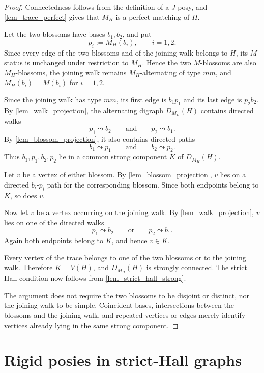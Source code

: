 \documentclass[preprint,12pt]{elsarticle}
\theoremstyle{plain}
\begin{document}
\begin{proof}
Connectedness follows from the definition of a \(J\)-posy, and
\cref{lem_trace_perfect} gives that \(M_H\) is a perfect matching of
\(H\).

Let the two blossoms have bases \(b_1,b_2\), and put
\[
p_i:=M_H(b_i),\qquad i=1,2.
\]
Since every edge of the two blossoms and of the joining walk belongs to
\(H\), its \(M\)-status is unchanged under restriction to \(M_H\). Hence
the two \(M\)-blossoms are also \(M_H\)-blossoms, the joining walk remains
\(M_H\)-alternating of type \(mm\), and \(M_H(b_i)=M(b_i)\) for
\(i=1,2\).

Since the joining walk has type \(mm\), its first edge is \(b_1p_1\) and
its last edge is \(p_2b_2\). By \cref{lem_walk_projection}, the alternating
digraph \(D_{M_H}(H)\) contains directed walks
\[
p_1\leadsto b_2
\qquad\text{and}\qquad
p_2\leadsto b_1.
\]
By \cref{lem_blossom_projection}, it also contains directed paths
\[
b_1\leadsto p_1
\qquad\text{and}\qquad
b_2\leadsto p_2.
\]
Thus \(b_1,p_1,b_2,p_2\) lie in a common strong component \(K\) of
\(D_{M_H}(H)\).

Let \(v\) be a vertex of either blossom. By
\cref{lem_blossom_projection}, \(v\) lies on a directed
\(b_i\)-\(p_i\) path for the corresponding blossom. Since both endpoints
belong to \(K\), so does \(v\).

Now let \(v\) be a vertex occurring on the joining walk. By
\cref{lem_walk_projection}, \(v\) lies on one of the directed walks
\[
p_1\leadsto b_2
\qquad\text{or}\qquad
p_2\leadsto b_1.
\]
Again both endpoints belong to \(K\), and hence \(v\in K\).

Every vertex of the trace belongs to one of the two blossoms or to the
joining walk. Therefore \(K=V(H)\), and \(D_{M_H}(H)\) is strongly
connected. The strict Hall condition now follows from
\cref{lem_strict_hall_strong}.

The argument does not require the two blossoms to be disjoint or distinct,
nor the joining walk to be simple. Coincident bases, intersections between
the blossoms and the joining walk, and repeated vertices or edges merely
identify vertices already lying in the same strong component.
\end{proof}


\section{Rigid posies in strict-Hall graphs}\label{sec_rigid_posies}
\end{document}
